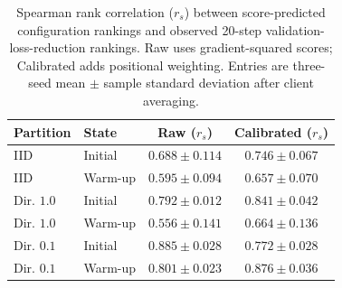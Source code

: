 \newcommand{\FMAdepthMin}{0.657}
\newcommand{\FMAdepthMax}{0.876}
\newcommand{\FMApositive}{90}
\newcommand{\FMAtotal}{90}
\newcommand{\FMAassociationSentence}{The positive setting-level associations support using the profiled utility to prioritize configurations in this controlled protocol.}
\begin{table}[t]
\centering
\caption{Spearman rank correlation ($r_s$) between score-predicted configuration rankings and observed 20-step validation-loss-reduction rankings. Raw uses gradient-squared scores; Calibrated adds positional weighting. Entries are three-seed mean $\pm$ sample standard deviation after client averaging.}
\label{tab:fm-score-reliability}
\small
\setlength{\tabcolsep}{3pt}
\begin{tabular}{@{}llcc@{}}
\toprule
Partition & State & Raw ($r_s$) & Calibrated ($r_s$) \\
\midrule
IID & Initial & $0.688\pm0.114$ & $0.746\pm0.067$ \\
IID & Warm-up & $0.595\pm0.094$ & $0.657\pm0.070$ \\
Dir. $1.0$ & Initial & $0.792\pm0.012$ & $0.841\pm0.042$ \\
Dir. $1.0$ & Warm-up & $0.556\pm0.141$ & $0.664\pm0.136$ \\
Dir. $0.1$ & Initial & $0.885\pm0.028$ & $0.772\pm0.028$ \\
Dir. $0.1$ & Warm-up & $0.801\pm0.023$ & $0.876\pm0.036$ \\
\bottomrule
\end{tabular}
\end{table}
